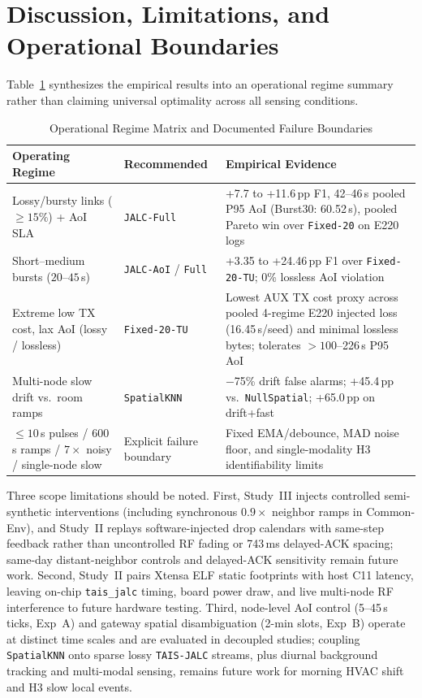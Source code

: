 \documentclass[journal,twoside,web]{ieeecolor}
\begin{document}
\section{Discussion, Limitations, and Operational Boundaries}

Table~\ref{tab:regimes} synthesizes the empirical results into an operational regime summary rather than claiming universal optimality across all sensing conditions.

\begin{table}[t]
\centering
\caption{Operational Regime Matrix and Documented Failure Boundaries}
\label{tab:regimes}
\scriptsize
\setlength{\tabcolsep}{3.0pt}
\renewcommand{\arraystretch}{0.95}
\begin{tabular}{@{} >{\raggedright\arraybackslash}p{1.90cm} >{\raggedright\arraybackslash}p{1.65cm} >{\raggedright\arraybackslash}p{3.95cm} @{}}
\toprule
Operating Regime & Recommended & Empirical Evidence \\
\midrule
Lossy/bursty links ($\ge 15\%$) + AoI SLA & \texttt{JALC-Full} & +7.7 to +11.6\,pp F1, 42--46\,s pooled P95 AoI (Burst30: 60.52\,s), pooled Pareto win over \texttt{Fixed-20} on E220 logs \\
Short--medium bursts ($20$--$45$\,s) & \texttt{JALC-AoI} / \texttt{Full} & +3.35 to +24.46\,pp F1 over \texttt{Fixed-20-TU}; 0\% lossless AoI violation \\
Extreme low TX cost, lax AoI (lossy / lossless) & \texttt{Fixed-20-TU} & Lowest AUX TX cost proxy across pooled 4-regime E220 injected loss (16.45\,s/seed) and minimal lossless bytes; tolerates $>100$--226\,s P95 AoI \\
Multi-node slow drift vs.\ room ramps & \texttt{SpatialKNN} & $-$75\% drift false alarms; +45.4\,pp vs.\ \texttt{NullSpatial}; +65.0\,pp on drift+fast \\
$\le 10$\,s pulses / 600\,s ramps / $7\times$ noisy / single-node slow & Explicit failure boundary & Fixed EMA/debounce, MAD noise floor, and single-modality H3 identifiability limits \\
\bottomrule
\end{tabular}
\end{table}

Three scope limitations should be noted. First, Study~III injects controlled semi-synthetic interventions (including synchronous $0.9\times$ neighbor ramps in Common-Env), and Study~II replays software-injected drop calendars with same-step feedback rather than uncontrolled RF fading or 743\,ms delayed-ACK spacing; same-day distant-neighbor controls and delayed-ACK sensitivity remain future work. Second, Study~II pairs Xtensa ELF static footprints with host C11 latency, leaving on-chip \texttt{tais\_jalc} timing, board power draw, and live multi-node RF interference to future hardware testing. Third, node-level AoI control (5--45\,s ticks, Exp~A) and gateway spatial disambiguation (2-min slots, Exp~B) operate at distinct time scales and are evaluated in decoupled studies; coupling \texttt{SpatialKNN} onto sparse lossy \texttt{TAIS-JALC} streams, plus diurnal background tracking and multi-modal sensing, remains future work for morning HVAC shift and H3 slow local events.
\end{document}
